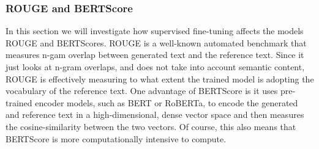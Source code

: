 \documentclass[11pt, oneside]{article}   	%
\begin{document}
\subsubsection{ROUGE and BERTScore}
In this section we will investigate how supervised fine-tuning affects the models ROUGE and BERTScores.
ROUGE is a well-known automated benchmark that measures n-gam overlap between generated text and the reference text.
Since it just looks at n-gram overlaps, and does not take into account semantic content, ROUGE is effectively measuring to what extent the trained model is adopting the vocabulary of the reference text.
One advantage of BERTScore is it uses pre-trained encoder models, such as BERT or RoBERTa, to encode the generated and reference text in a high-dimensional, dense vector space and then measures the cosine-similarity between the two vectors.
Of course, this also means that BERTScore is more computationally intensive to compute.
\end{document}
